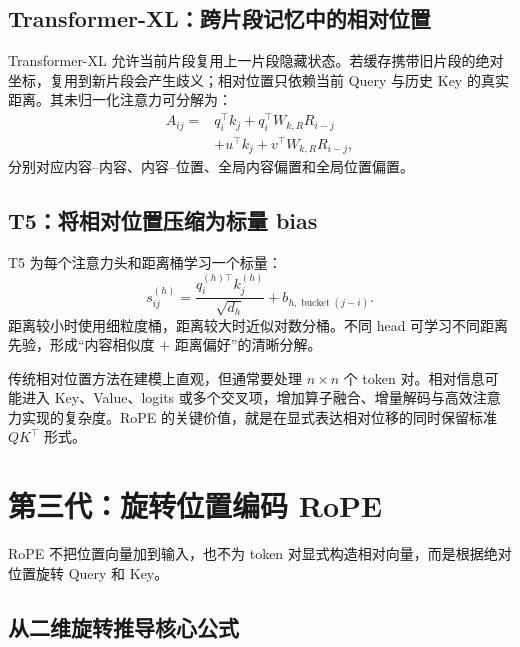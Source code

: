 \documentclass[UTF8,fontset=none,a4paper,10pt]{ctexart}
\begin{document}
\subsection{Transformer-XL：跨片段记忆中的相对位置}

Transformer-XL 允许当前片段复用上一片段隐藏状态\cite{zh:dai2019}。若缓存携带旧片段的绝对坐标，复用到新片段会产生歧义；相对位置只依赖当前 Query 与历史 Key 的真实距离。其未归一化注意力可分解为：
\begin{equation}
  \begin{aligned}
  A_{ij}={}&q_i^\top k_j+q_i^\top W_{k,R}R_{i-j}\\
           &+u^\top k_j+v^\top W_{k,R}R_{i-j},
  \end{aligned}
  \label{zh:eq:txl}
\end{equation}
分别对应内容--内容、内容--位置、全局内容偏置和全局位置偏置。

\subsection{T5：将相对位置压缩为标量 bias}

T5 为每个注意力头和距离桶学习一个标量\cite{zh:raffel2020}：
\begin{equation}
  s_{ij}^{(h)}=
  \frac{q_i^{(h)\top}k_j^{(h)}}{\sqrt{d_h}}
  +b_{h,\operatorname{bucket}(j-i)}.
  \label{zh:eq:t5-bias}
\end{equation}
距离较小时使用细粒度桶，距离较大时近似对数分桶。不同 head 可学习不同距离先验，形成“内容相似度 $+$ 距离偏好”的清晰分解。

传统相对位置方法在建模上直观，但通常要处理 $n\times n$ 个 token 对。相对信息可能进入 Key、Value、logits 或多个交叉项，增加算子融合、增量解码与高效注意力实现的复杂度。RoPE 的关键价值，就是在显式表达相对位移的同时保留标准 $QK^\top$ 形式。

\section{第三代：旋转位置编码 RoPE}

RoPE 不把位置向量加到输入，也不为 token 对显式构造相对向量，而是根据绝对位置旋转 Query 和 Key\cite{zh:su2021}。

\subsection{从二维旋转推导核心公式}
\end{document}
